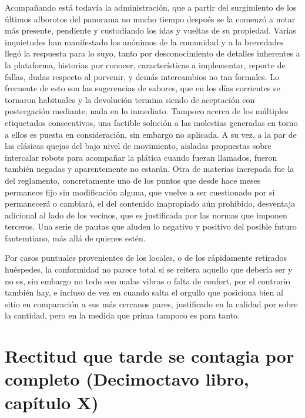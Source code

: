 \documentclass[
]{book}
\begin{document}
Acompañando está todavía la administración, que a partir del surgimiento de los últimos alborotos del panorama no mucho tiempo después se la comenzó a notar más presente, pendiente y custodiando los idas y vueltas de su propiedad. Varias inquietudes han manifestado los anónimos de la comunidad y a la brevedades llegó la respuesta para lo suyo, tanto por desconocimiento de detalles inherentes a la plataforma, historias por conocer, características a implementar, reporte de fallas, dudas respecto al porvenir, y demás intercambios no tan formales. Lo frecuente de esto son las sugerencias de sabores, que en los días corrientes se tornaron habituales y la devolución termina siendo de aceptación con postergación mediante, nada en lo inmediato. Tampoco acerca de los múltiples etiquetados consecutivos, una factible solución a las molestias generadas en torno a ellos es puesta en consideración, sin embargo no aplicada. A su vez, a la par de las clásicas quejas del bajo nivel de movimiento, aisladas propuestas sobre intercalar robots para acompañar la plática cuando fueran llamados, fueron también negadas y aparentemente no estarán. Otra de materias increpada fue la del reglamento, concretamente uno de los puntos que desde hace meses permanece fijo sin modificación alguna, que vuelve a ser cuestionado por si permanecerá o cambiará, el del contenido inapropiado aún prohibido, desventaja adicional al lado de los vecinos, que es justificada por las normas que imponen terceros. Una serie de pautas que aluden lo negativo y positivo del posible futuro fantemtiano, más allá de quienes estén.

Por casos puntuales provenientes de los locales, o de los rápidamente retirados huéspedes, la conformidad no parece total si se reitera aquello que debería ser y no es, sin embargo no todo son malas vibras o falta de confort, por el contrario también hay, e incluso de vez en cuando salta el orgullo que posiciona bien al sitio en comparación a sus más cercanos pares, justificado en la calidad por sobre la cantidad, pero en la medida que prima tampoco es para tanto.

\hypertarget{rectitud-que-tarde-se-contagia-por-completo-decimoctavo-libro-capuxedtulo-x}{%
\section{Rectitud que tarde se contagia por completo (Decimoctavo libro, capítulo X)}\label{rectitud-que-tarde-se-contagia-por-completo-decimoctavo-libro-capuxedtulo-x}}
\end{document}
